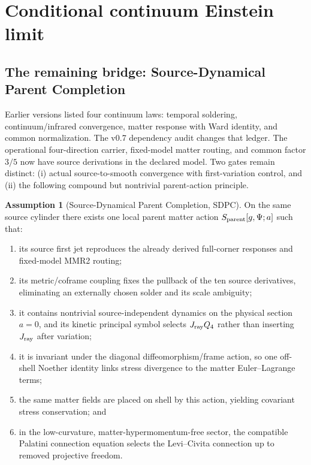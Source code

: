 \documentclass[11pt]{article}
\theoremstyle{definition}
\newtheorem{assumption}[theorem]{Assumption}
\theoremstyle{remark}
\begin{document}
\section{Conditional continuum Einstein limit}

\subsection{The remaining bridge: Source-Dynamical Parent Completion}

Earlier versions listed four continuum laws: temporal soldering, continuum/infrared convergence, matter response with Ward identity, and common normalization. The v0.7 dependency audit changes that ledger. The operational four-direction carrier, fixed-model matter routing, and common factor $3/5$ now have source derivations in the declared model. Two gates remain distinct: (i) actual source-to-smooth convergence with first-variation control, and (ii) the following compound but nontrivial parent-action principle.

\begin{assumption}[Source-Dynamical Parent Completion, SDPC]\label{ass:sdpc}
On the same source cylinder there exists one local parent matter action $S_{\rm parent}[g,\Psi;a]$ such that:
\begin{enumerate}
\item its source first jet reproduces the already derived full-corner responses and fixed-model MMR2 routing;
\item its metric/coframe coupling fixes the pullback of the ten source derivatives, eliminating an externally chosen solder and its scale ambiguity;
\item it contains nontrivial source-independent dynamics on the physical section $a=0$, and its kinetic principal symbol selects $J_{\rm ray}Q_4$ rather than inserting $J_{\rm ray}$ after variation;
\item it is invariant under the diagonal diffeomorphism/frame action, so one off-shell Noether identity links stress divergence to the matter Euler--Lagrange terms;
\item the same matter fields are placed on shell by this action, yielding covariant stress conservation; and
\item in the low-curvature, matter-hypermomentum-free sector, the compatible Palatini connection equation selects the Levi--Civita connection up to removed projective freedom.
\end{enumerate}
\end{assumption}
\end{document}
